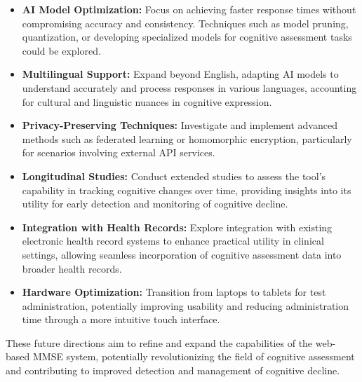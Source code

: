 \begin{itemize}
    \item \textbf{AI Model Optimization:} Focus on achieving faster response times without compromising accuracy and consistency. Techniques such as model pruning, quantization, or developing specialized models for cognitive assessment tasks could be explored.
    
    \item \textbf{Multilingual Support:} Expand beyond English, adapting AI models to understand accurately and process responses in various languages, accounting for cultural and linguistic nuances in cognitive expression.
    
    \item \textbf{Privacy-Preserving Techniques:} Investigate and implement advanced methods such as federated learning or homomorphic encryption, particularly for scenarios involving external API services.
    
    \item \textbf{Longitudinal Studies:} Conduct extended studies to assess the tool's capability in tracking cognitive changes over time, providing insights into its utility for early detection and monitoring of cognitive decline.
    
    \item \textbf{Integration with Health Records:} Explore integration with existing electronic health record systems to enhance practical utility in clinical settings, allowing seamless incorporation of cognitive assessment data into broader health records.
        
    \item \textbf{Hardware Optimization:} Transition from laptops to tablets for test administration, potentially improving usability and reducing administration time through a more intuitive touch interface.
\end{itemize}

These future directions aim to refine and expand the capabilities of the web-based MMSE system, potentially revolutionizing the field of cognitive assessment and contributing to improved detection and management of cognitive decline.